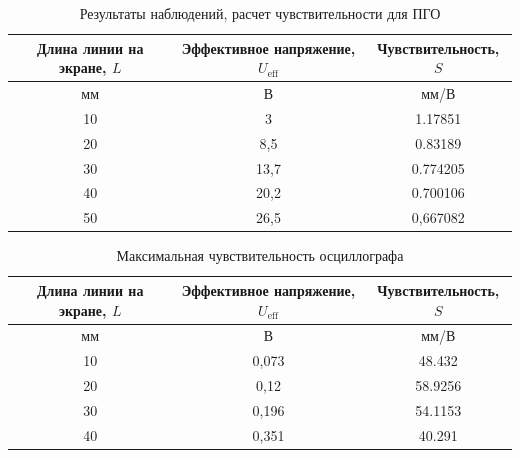 \begin{center}
\begin{table}[h!]
\centering
\caption{Результаты наблюдений, расчет чувствительности для ПГО}
\label{tabl:2}
\begin{tabular}{|c|c|c|}
\hline
\begin{minipage}{5cm}
    Длина линии на экране, \( L \)
\end{minipage} &
\begin{minipage}{5cm}
    Эффективное напряжение, $U_{\text{eff}}$
\end{minipage} &
\begin{minipage}{5cm}
    Чувствительность, \( S \)
\end{minipage}\\
\hline
мм&В&мм/В\\
\hline
10 & 3 & 1.17851 \\
20 & 8,5 & 0.83189 \\
30 & 13,7 & 0.774205 \\
40 & 20,2 & 0.700106 \\
50 & 26,5 & 0,667082 \\
\hline
\end{tabular}
\end{table}
\end{center}

\begin{center}
\begin{table}[h!]
\centering
\caption{Максимальная чувствительность осциллографа}
\label{tabl:3}
\begin{tabular}{|c|c|c|}
\hline
\begin{minipage}{5cm}
    Длина линии на экране, \( L \)
\end{minipage} &
\begin{minipage}{5cm}
    Эффективное напряжение, $U_{\text{eff}}$
\end{minipage} &
\begin{minipage}{5cm}
    Чувствительность, \( S \)
\end{minipage}\\
\hline
мм&В&мм/В\\
\hline
10 & 0,073 & 48.432 \\
20 & 0,12 & 58.9256 \\
30 & 0,196 & 54.1153 \\
40 & 0,351 & 40.291 \\
\hline
\end{tabular}
\end{table}
\end{center}

